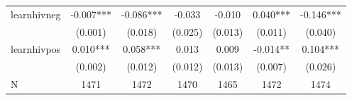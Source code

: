 \begin{tabular}{lcccccc}
\hline
learnhivneg & -0.007*** & -0.086*** & -0.033 & -0.010 & 0.040*** & -0.146*** \\
 & (0.001) & (0.018) & (0.025) & (0.013) & (0.011) & (0.040) \\
learnhivpos & 0.010*** & 0.058*** & 0.013 & 0.009 & -0.014** & 0.104*** \\
 & (0.002) & (0.012) & (0.012) & (0.013) & (0.007) & (0.026) \\
\hline
N & 1471 & 1472 & 1470 & 1465 & 1472 & 1474 \\
\hline
\end{tabular}
